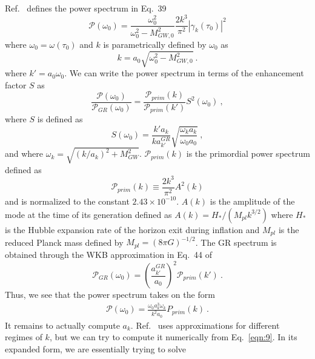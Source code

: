 \documentclass[prd,twocolumn,aps,psfig,nofootinbib,nobibnotes,superscriptaddress,preprintnumbers,times]{revtex4-2}
\begin{document}
Ref.\ \cite{Gumrukcuoglu:2012} defines the power spectrum in Eq.\ 39
\begin{equation}\label{eqn:12}
    \mathcal{P}(\omega_0)= \frac{\omega_0^2}{\omega_0^2 - M_{GW,0}^2}\frac{2k^3}{\pi^2}|\gamma_k(\tau_0)|^2
\end{equation}
where $\omega_0 = \omega(\tau_0)$ and $k$ is parametrically defined by $\omega_0$ as
\begin{equation}\label{eqn:13}
    k = a_0 \sqrt{\omega_0^2 -  M_{GW,0}^2} \ .
\end{equation}
where $k' = a_0 \omega_0$. We can write the power spectrum in terms of the enhancement factor $S$ as
\begin{equation}\label{eqn:14}
    \frac{\mathcal{P}(\omega_0)}{\mathcal{P}_{GR}(\omega_0)} = \frac{\mathcal{P}_{prim}(k)}{\mathcal{P}_{prim}(k')}S^2(\omega_0)\ ,
\end{equation}
where $S$ is defined as 
\begin{equation}\label{eqn:15}
    S(\omega_0) = \frac{k' a_k}{k a_{k'}^{GR}} \sqrt{\frac{\omega_k a_k}{\omega_0 a_0}}\ ,
\end{equation}
and where $\omega_k = \sqrt{(k/a_k)^2 + M_{GW}^2}$. $\mathcal{P}_{prim}(k)$ is the primordial power spectrum defined as 
\begin{equation}\label{eqn:16}
    \mathcal{P}_{prim}(k) \equiv \frac{2k^3}{\pi^2}A^2(k)
\end{equation}and is normalized to the constant $2.43\times 10^{-10}$. $A(k)$ is the amplitude of the mode at the time of its generation defined as $A(k) = H_*/(M_{pl} k^{3/2})$ where $H_*$ is the Hubble expansion rate of the horizon exit during inflation and $M_{pl}$ is the reduced Planck mass defined by $M_{pl} = (8\pi G)^{-1/2}$. The GR spectrum is obtained through the WKB approximation in Eq.\ 44 of \cite{Gumrukcuoglu:2012}
\begin{equation}\label{eqn:17}
    \mathcal{P}_{GR}(\omega_0) =  \left( \frac{a_{k'}^{GR}}{a_0}\right)^2 \mathcal{P}_{prim}(k')\ .
\end{equation}
Thus, we see that the power spectrum takes on the form 
\begin{equation}\label{eqn:18}
    \begin{multlined}
    \mathcal{P}(\omega_0)  = \frac{\omega_0 a_k^3 \omega_k}{k^2 a_0} P_{prim}(k)\ .
    \end{multlined}
\end{equation}
It remains to actually compute $a_k$. Ref.\ \cite{Gumrukcuoglu:2012} uses approximations for different regimes of $k$, but we can try to compute it numerically from Eq.\ \ref{eqn:9}. In its expanded form, we are essentially trying to solve 
\end{document}
